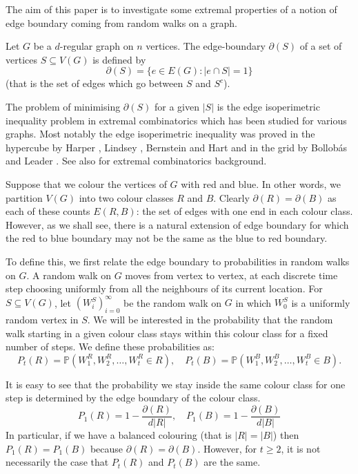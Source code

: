 \documentclass[12pt,a4paper]{article}
\newcommand{\PP}{\mathbb P}
\begin{document}
The aim of this paper is to investigate some extremal properties of a notion of edge boundary coming from random walks on a graph.

Let $G$ be a $d$-regular graph on $n$ vertices. The edge-boundary $\partial(S)$ of a set of vertices $S\subseteq V(G)$ is defined by 
\[
\partial(S)=\{e\in E(G): |e\cap S|=1\}
\]
(that is the set of edges which go between $S$ and $S^c$). 

The problem of minimising $\partial(S)$ for a given $|S|$ is the edge isoperimetric inequality problem in extremal combinatorics which has been studied for various graphs. Most notably the edge isoperimetric inequality was proved in the hypercube by Harper \cite{harper}, Lindsey \cite{lindsey}, Bernstein \cite{bernstein} and Hart \cite{hart} and in the grid by Bollob\'as and Leader \cite{bollobas-leader}. See also \cite{bollobas-comb} for extremal combinatorics background.

Suppose that we colour the vertices of $G$ with red and blue. In other words, we partition $V(G)$ into two colour classes $R$ and $B$. Clearly $\partial(R)=\partial(B)$ as each of these counts $E(R,B)$: the set of edges with one end in each colour class. However, as we shall see, there is a natural extension of edge boundary for which the red to blue boundary may not be the same as the blue to red boundary.

To define this, we first relate the edge boundary to probabilities in random walks on $G$. A random walk on $G$ moves from vertex to vertex, at each discrete time step choosing uniformly from all the neighbours of its current location. For $S\subseteq V(G)$, let $(W^S_i)_{i=0}^{\infty}$ be the random walk on $G$ in which $W^S_0$ is a uniformly random vertex in $S$. We will be interested in the probability that the random walk starting in a given colour class stays within this colour class for a fixed number of steps. We define these probabilities as:
\[
P_t(R)=\PP(W^R_1,W^R_2,\ldots, W^R_t\in R), \quad P_t(B)=\PP(W^B_1,W^B_2,\ldots, W^B_t\in B).
\]

It is easy to see that the probability we stay inside the same colour class for one step is determined by the edge boundary of the colour class. 
\[
P_1(R)=1-\frac{\partial(R)}{d|R|}, \quad P_1(B)=1-\frac{\partial(B)}{d|B|}
\]
In particular, if we have a balanced colouring (that is $|R|=|B|$) then $P_1(R)=P_1(B)$ because $\partial(R)=\partial(B)$. However, for $t\geq 2$, it is not necessarily the case that $P_t(R)$ and $P_t(B)$ are the same. 
\end{document}
